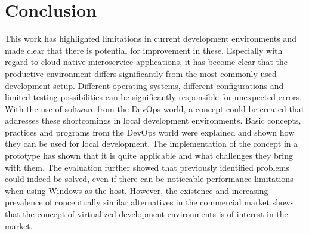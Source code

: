 
\section{Conclusion}\label{sec::conclusion}

This work has highlighted limitations in current development environments and made clear that there is potential for improvement in these. Especially with regard to cloud native microservice applications, it has become clear that the productive environment differs significantly from the most commonly used development setup.  Different operating systems, different configurations and limited testing possibilities can be significantly responsible for unexpected errors.\newline
With the use of software from the DevOps world, a concept could be created that addresses these shortcomings in local development environments. Basic concepts, practices and programs from the DevOps world were explained and shown how they can be used for local development. The implementation of the concept in a prototype has shown that it is quite applicable and what challenges they bring with them. The evaluation further showed that previously identified problems could indeed be solved, even if there can be noticeable performance limitations when using Windows as the host.
However, the existence and increasing prevalence of conceptually similar alternatives in the commercial market shows that the concept of virtualized development environments is of interest in the market.


